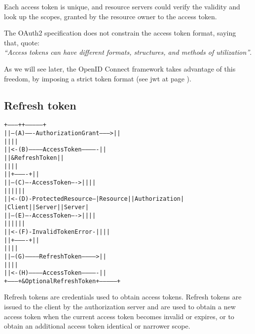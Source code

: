 Each access token is unique, and resource servers could verify the validity and
look up the scopes, granted by the resource owner to the access token.

The OAuth2 specification does not constrain the access token format, saying
that, quote: \\
\textit{``Access tokens can have different formats, structures, and methods of
utilization''}.

As we will see later, the OpenID Connect framework takes advantage of this
freedom, by imposing a strict token format (see \ac{jwt} at page \pageref{jwt}).

\subsection{Refresh token}
\begin{alltt}
  +--------+                                           +---------------+
  |        |--(A)------- Authorization Grant --------->|               |
  |        |                                           |               |
  |        |<-(B)----------- Access Token -------------|               |
  |        |               & Refresh Token             |               |
  |        |                                           |               |
  |        |                            +----------+   |               |
  |        |--(C)---- Access Token ---->|          |   |               |
  |        |                            |          |   |               |
  |        |<-(D)- Protected Resource --| Resource |   | Authorization |
  | Client |                            |  Server  |   |     Server    |
  |        |--(E)---- Access Token ---->|          |   |               |
  |        |                            |          |   |               |
  |        |<-(F)- Invalid Token Error -|          |   |               |
  |        |                            +----------+   |               |
  |        |                                           |               |
  |        |--(G)----------- Refresh Token ----------->|               |
  |        |                                           |               |
  |        |<-(H)----------- Access Token -------------|               |
  +--------+           & Optional Refresh Token        +---------------+
\end{alltt}

Refresh tokens are credentials used to obtain access tokens. Refresh tokens are
issued to the client by the authorization server and are used to obtain a new
access token when the current access token becomes invalid or expires, or to
obtain an additional access token identical or narrower scope.

